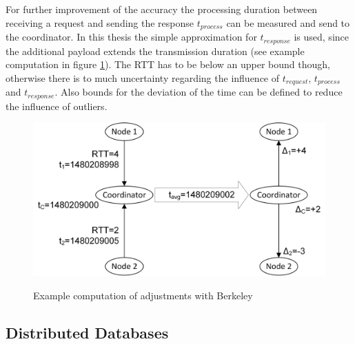 		 For further improvement of the accuracy the processing duration between receiving a request and sending the response $t_{process}$ can be measured and send to the coordinator. In this thesis the simple approximation for $t_{response}$ is used, since the additional payload extends the transmission duration (see example computation in figure \ref{figure:berkeley example}). The \gls{RTT} has to be below an upper bound though, otherwise there is to much uncertainty regarding the influence of $t_{request}$, $t_{process}$ and $t_{response}$.
		 Also bounds for the deviation of the time can be defined to reduce the influence of outliers.
		 
		 \begin{figure}[htbp] %
		 \caption{Example computation of adjustments with Berkeley}
		 \includegraphics[scale=1.0]{figures/berkeley-example.png}
		 \label{figure:berkeley example}
		 \end{figure}
		
		\subsection{Distributed Databases}
		\label{Distributed Database}
		
		
		
	
